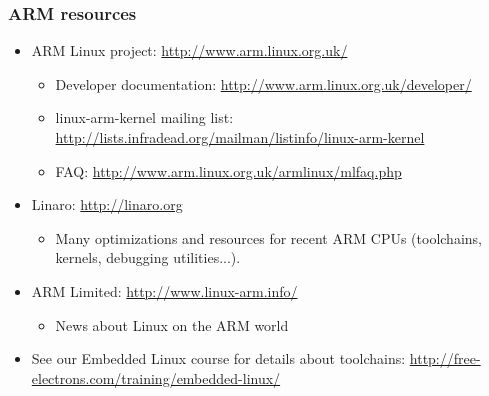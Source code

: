 \begin{frame}
  \frametitle{ARM resources}
  \begin{itemize}
  \item ARM Linux project: \url{http://www.arm.linux.org.uk/}
    \begin{itemize}
    \item Developer documentation:
      \url{http://www.arm.linux.org.uk/developer/}
    \item linux-arm-kernel mailing list:
      \url{http://lists.infradead.org/mailman/listinfo/linux-arm-kernel}
    \item FAQ: \url{http://www.arm.linux.org.uk/armlinux/mlfaq.php}
    \end{itemize}
  \item Linaro: \url{http://linaro.org}
    \begin{itemize}
    \item Many optimizations and resources for recent ARM CPUs
      (toolchains, kernels, debugging utilities...).
    \end{itemize}
  \item ARM Limited: \url{http://www.linux-arm.info/}
    \begin{itemize}
    \item News about Linux on the ARM world
    \end{itemize}
  \item See our Embedded Linux course for details about toolchains:
    {\small
     \url{http://free-electrons.com/training/embedded-linux/}}
  \end{itemize}
\end{frame}
